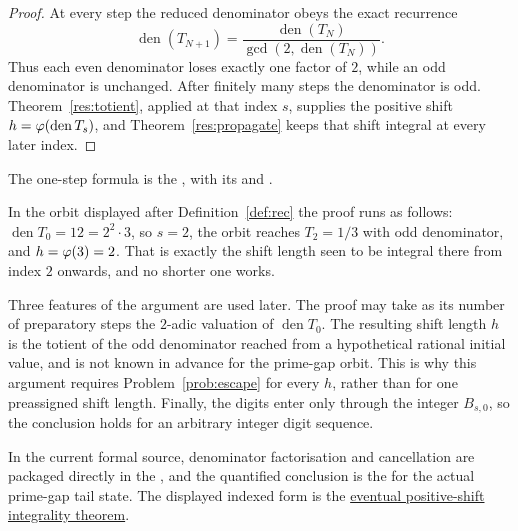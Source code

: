 \documentclass[11pt]{article}
\begin{document}
\begin{proof}
At every step the reduced denominator obeys the exact recurrence
\[
 \operatorname{den}(T_{N+1})
 =\frac{\operatorname{den}(T_N)}{\gcd(2,\operatorname{den}(T_N))}.
\]
Thus each even denominator loses exactly one factor of $2$, while an odd
denominator is unchanged.  After finitely many steps the denominator is odd.
Theorem~\ref{res:totient}, applied at that index $s$, supplies
the positive shift $h=\varphi(\operatorname{den}T_s)$, and
Theorem~\ref{res:propagate} keeps that shift integral at every later index.
\end{proof}

\noindent The one-step formula is the
,
with its
and
.

In the orbit displayed after Definition~\ref{def:rec} the proof runs as
follows: $\operatorname{den}T_0=12=2^{2}\cdot3$, so $s=2$, the orbit reaches
$T_2=1/3$ with odd denominator, and $h=\varphi(3)=2$.  That is exactly the shift
length seen to be integral there from index $2$ onwards, and no shorter one
works.

Three features of the argument are used later.  The proof may take as its
number of preparatory steps the $2$-adic valuation of
$\operatorname{den}T_0$.  The resulting shift length $h$ is the totient of the
odd denominator reached from a hypothetical rational initial value, and is
not known in advance for the prime-gap orbit.  This is why this argument
requires Problem~\ref{prob:escape} for every $h$, rather than for one
preassigned shift length.  Finally, the digits enter only through the integer
$B_{s,0}$, so the conclusion holds for an arbitrary integer digit sequence.

\noindent In the current formal source, denominator factorisation and
cancellation are packaged directly in the
, and the quantified conclusion is the
 for the actual prime-gap tail state.  The displayed
indexed form is the \href{https://github.com/wcook04/plectis-erdos/blob/f36a98bf3d3e6f65f1074e3b800e3293d5b8a51a/ErdosProblems/Erdos251/PaperCoreR7.lean#L84}{eventual positive-shift integrality theorem}.
\end{document}
